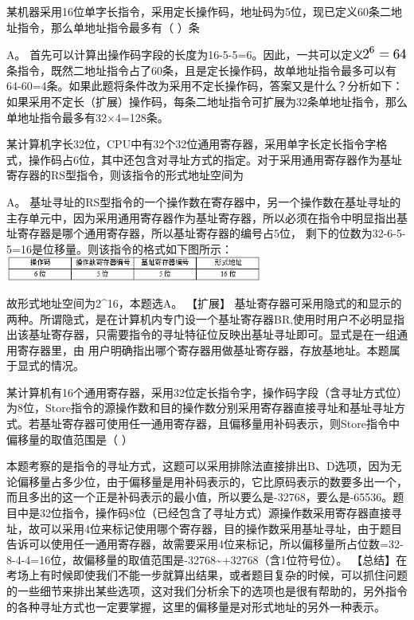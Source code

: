 \question 某机器采用16位单字长指令，采用定长操作码，地址码为5位，现已定义60条二地址指令，那么单地址指令最多有（
）条
\par{}
\begin{solution}A。
首先可以计算出操作码字段的长度为16-5-5=6。因此，一共可以定义\includegraphics[width=0.56250in,height=0.16667in]{texmath/e1c5005Cdpi7B3507D25E63D64}条指令，既然二地址指令占了60条，且是定长操作码，故单地址指令最多可以有64-60=4条。如果此题将条件改为采用不定长操作码，答案又是什么？分析如下：
如果采用不定长（扩展）操作码，每条二地址指令可扩展为32条单地址指令，那么单地址指令最多有32×4=128条。
\end{solution}
\question 某计算机字长32位，CPU中有32个32位通用寄存器，采用单字长定长指令字格式，操作码占6位，其中还包含对寻址方式的指定。对于采用通用寄存器作为基址寄存器的RS型指令，则该指令的形式地址空间为
\par{}
\begin{solution}A。
基址寻址的RS型指令的一个操作数在寄存器中，另一个操作数在基址寻址的主存单元中，因为采用通用寄存器作为基址寄存器，所以必须在指令中明显指出基址寄存器是哪个通用寄存器，所以基址寄存器的编号占5位，
剩下的位数为32-6-5-5=16是位移量。则该指令的格式如下图所示：
\includegraphics[width=3.33333in,height=0.31250in]{computerassets/5f6d4ab9dd73df215b670169449c0593.jpeg}~

故形式地址空间为2\^{}16，本题选A。 【扩展】
基址寄存器可采用隐式的和显示的两种。所谓隐式，是在计算机内专门设一个基址寄存器BR,使用时用户不必明显指出该基址寄存器，只需要指令的寻址特征位反映出基址寻址即可。显式是在一组通用寄存器里，由
用户明确指出哪个寄存器用做基址寄存器，存放基地址。本题属于显式的情况。
\end{solution}
\question 某计算机有16个通用寄存器，采用32位定长指令字，操作码字段（含寻址方式位）为8位，Store指令的源操作数和目的操作数分别采用寄存器直接寻址和基址寻址方式。若基址寄存器可使用任一通用寄存器，且偏移量用补码表示，则Store指令中偏移量的取值范围是（
）
\par{}
\begin{solution}本题考察的是指令的寻址方式，这题可以采用排除法直接排出B、D选项，因为无论偏移量占多少位，由于偏移量是用补码表示的，它比原码表示的数要多出一个，而且多出的这一个正是补码表示的最小值，所以要么是-32768，要么是-65536。题目中是32位指令，操作码8位（已经包含了寻址方式）源操作数采用寄存器直接寻址，故可以采用4位来标记使用哪个寄存器，目的操作数采用基址寻址，由于题目告诉可以使用任一通用寄存器，故需要采用4位来标记，所以偏移量所占位数=32-8-4-4=16位，故偏移量的取值范围是-32768\textasciitilde{}+32768（含1位符号位）。
【总结】在考场上有时候即使我们不能一步就算出结果，或者题目复杂的时候，可以抓住问题的一些细节来排出某些选项，这对我们分析余下的选项也是很有帮助的，另外指令的各种寻址方式也一定要掌握，这里的偏移量是对形式地址的另外一种表示。
\end{solution}
